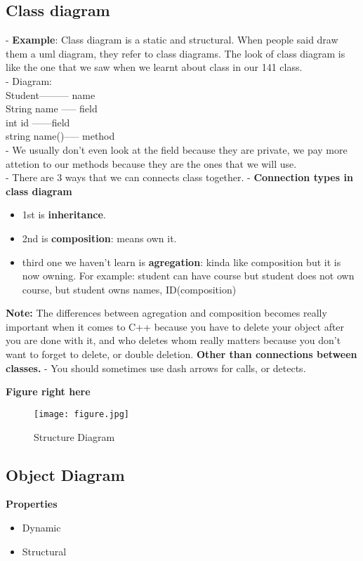\documentclass{article}
\begin{document}
\subsection{Class diagram}
- \textbf{Example}: Class diagram is a static and structural. When people said
draw them a uml diagram, they refer to class diagrams. The look of class diagram is like
the one that we saw when we learnt about class in our 141 class.\\
 - Diagram:\\
  Student--------- name\\
  String name ----- field\\
  int id     ------field\\
  string  name()----- method\\
  - We usually don't even look at the field because they are private, we pay
  more attetion to our methods because they are the ones that we will use.\\

-  There are 3 ways that we can connects class together.
-  \textbf{Connection types in class diagram}
 \begin{itemize}
  \item 1st is \textbf{inheritance}.
  \item 2nd is \textbf{composition}: means own it.
  \item third one we haven't learn is \textbf{agregation}: kinda like
  composition but it is now owning. For example: student can have course but student does not own
  course, but student owns names, ID(composition)
\end{itemize}
\textbf{Note:} The differences between agregation and composition becomes really
important when it comes to C++ because you have to delete your object after you
are done with it, and who deletes whom really matters because you don't want to
forget to delete, or double deletion.
\textbf{Other than connections between classes.}
- You should sometimes use dash arrows for calls, or detects. \\
\pagebreak

\textbf{Figure right here}
\begin{figure}[ht!]
\centering
\texttt{[image: figure.jpg]}
\caption{Structure Diagram}
\label{overflow}
\end{figure}

\subsection{Object Diagram}
\textbf{Properties}
\begin{itemize}
  \item Dynamic
  \item Structural
\end{itemize}
\end{document}
